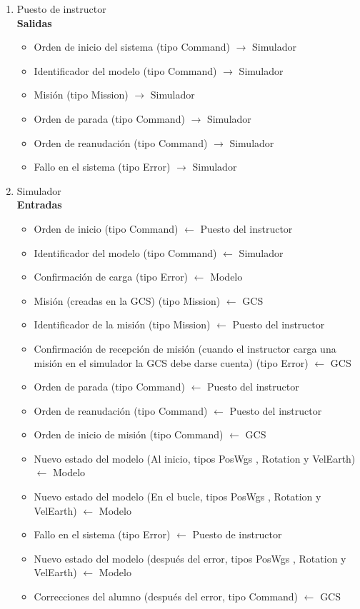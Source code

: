 \documentclass[12pt,a4paper,spanish]{book} %
\begin{document}
\begin{enumerate}
\item Puesto de instructor
\\
\textbf{Salidas}

\begin{itemize}

\item Orden de inicio del sistema (tipo Command) $\rightarrow$ Simulador
\item Identificador del modelo (tipo Command) $\rightarrow$ Simulador
\item Misión (tipo Mission) $\rightarrow$ Simulador
\item Orden de parada (tipo Command) $\rightarrow$ Simulador
\item Orden de reanudación (tipo Command) $\rightarrow$ Simulador
\item Fallo en el sistema (tipo Error) $\rightarrow$ Simulador

\end{itemize}

\item Simulador
\\
\textbf{Entradas}

\begin{itemize}

\item Orden de inicio (tipo Command) $\leftarrow$ Puesto del instructor
\item Identificador del modelo (tipo Command) $\leftarrow$ Simulador
\item Confirmación de carga (tipo Error) $\leftarrow$ Modelo
\item Misión (creadas en la GCS) (tipo Mission) $\leftarrow$ GCS
\item Identificador de la misión (tipo Mission) $\leftarrow$ Puesto del instructor
\item Confirmación de recepción de misión (cuando el instructor carga una misión en el simulador la GCS debe darse cuenta) (tipo Error) $\leftarrow$ GCS
\item Orden de parada (tipo Command) $\leftarrow$ Puesto del instructor
\item Orden de reanudación (tipo Command) $\leftarrow$ Puesto del instructor
\item Orden de inicio de misión (tipo Command) $\leftarrow$ GCS
\item Nuevo estado del modelo (Al inicio, tipos PosWgs , Rotation y VelEarth) $\leftarrow$ Modelo
\item Nuevo estado del modelo (En el bucle, tipos PosWgs , Rotation y VelEarth) $\leftarrow$ Modelo
\item Fallo en el sistema (tipo Error) $\leftarrow$ Puesto de instructor
\item Nuevo estado del modelo (después del error, tipos PosWgs , Rotation y VelEarth) $\leftarrow$ Modelo
\item Correcciones del alumno (después del error, tipo Command) $\leftarrow$ GCS



\end{itemize}
\end{enumerate}
\end{document}
